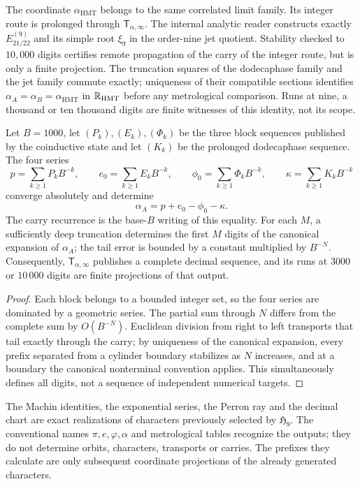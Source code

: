 The coordinate \(\alpha_{\mathrm{HMT}}\) belongs to the same correlated limit
family. Its integer route is prolonged through
\(\mathsf T_{\alpha,\infty}\). The internal analytic
reader constructs exactly \(E_{21/22}^{(9)}\) and its simple root
\(\xi_9\) in the order-nine jet quotient. Stability checked to
\(10,000\) digits certifies remote propagation of the carry of the integer
route, but is only a finite projection. The truncation squares of
the dodecaphase family and the jet family commute exactly;
uniqueness of their compatible sections identifies
\(\alpha_A=\alpha_B=\alpha_{\mathrm{HMT}}\) in
\(\mathbb R_{\rm HMT}\) before any metrological comparison. Runs at
nine, a thousand or ten thousand digits are finite witnesses of this identity, not its
scope.

\begin{proposition}
\label{prop:c27-alpha-prolongacion-completa}
Let \(B=1000\), let \((P_k),(E_k),(\Phi_k)\) be the three block sequences
published by the coinductive state and let \((K_k)\) be the prolonged
dodecaphase sequence. The four series
\[
 p=\sum_{k\geq1}P_kB^{-k},\qquad
 e_0=\sum_{k\geq1}E_kB^{-k},\qquad
 \phi_0=\sum_{k\geq1}\Phi_kB^{-k},\qquad
 \kappa=\sum_{k\geq1}K_kB^{-k}
\]
converge absolutely and determine
\[
 \alpha_A=p+e_0-\phi_0-\kappa.
\]
The carry recurrence is the base-\(B\) writing of this equality.
For each \(M\), a sufficiently deep truncation determines the
first \(M\) digits of the canonical expansion of \(\alpha_A\); the tail
error is bounded by a constant multiplied by \(B^{-N}\).
Consequently, \(\mathsf T_{\alpha,\infty}\) publishes a complete decimal
sequence, and its runs at \(3000\) or \(10\,000\) digits are finite
projections of that output.
\end{proposition}

\begin{proof}
Each block belongs to a bounded integer set, so the four
series are dominated by a geometric series. The partial sum through \(N\)
differs from the complete sum by \(O(B^{-N})\). Euclidean division from
right to left transports that tail exactly through the carry;
by uniqueness of the canonical expansion, every prefix separated from
a cylinder boundary stabilizes as \(N\) increases, and at a boundary
the canonical nonterminal convention applies. This simultaneously defines
all digits, not a sequence of independent numerical targets.
\end{proof}

\begin{corollary}
\label{cor:c27-generacion-reconocimiento}
The Machin identities, the exponential series, the Perron ray and the decimal
chart are exact realizations of characters previously selected
by \(\mathfrak H_9\). The conventional names \(\pi,e,\varphi,\alpha\)
and metrological tables recognize the outputs; they do not determine orbits,
characters, transports or carries. The prefixes they calculate are only
subsequent coordinate projections of the already generated characters.
\end{corollary}

